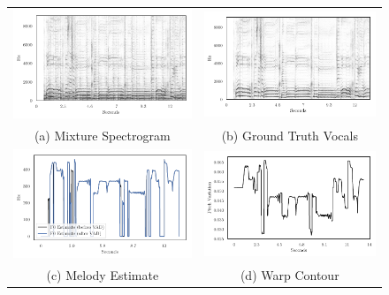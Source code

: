 \begin{figure}
\begin{tabular}{cc}
  \includegraphics[width=65mm]{Chapters/05_Separation_Known/warp-demo/Mixture.pdf} & \includegraphics[width=65mm]{Chapters/05_Separation_Known/warp-demo/reference.pdf} \\
(a) Mixture Spectrogram & (b) Ground Truth Vocals \\[6pt]
\includegraphics[width=65mm]{Chapters/05_Separation_Known/warp-demo/Melodia.pdf} & \includegraphics[width=65mm]{Chapters/05_Separation_Known/warp-demo/Contour.pdf} \\
(c) Melody Estimate & (d) Warp Contour \\[6pt]

\end{tabular}
\end{figure}
